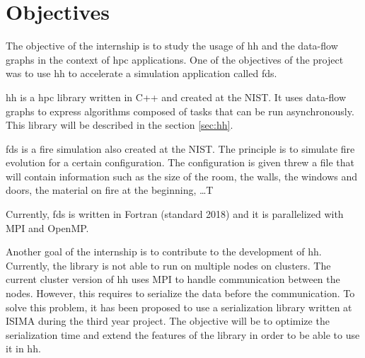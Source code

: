 
\clearpage
\section{Objectives}

The objective of the internship is to study the usage of \gls{hh} and the
data-flow graphs in the context of \gls{hpc} applications. One of the objectives
of the project was to use \gls{hh} to accelerate a simulation application called
\gls{fds}.

\gls{hh} is a \gls{hpc} library written in C++ and created at the NIST. It uses
data-flow graphs to express algorithms composed of tasks that can be run
asynchronously. This library will be described in the section \ref{sec:hh}.

\gls{fds} is a fire simulation also created at the NIST. The principle is to
simulate fire evolution for a certain configuration. The configuration is given
threw a file that will contain information such as the size of the room, the
walls, the windows and doors, the material on fire at the beginning, \dots T

Currently, \gls{fds} is written in Fortran (standard 2018) and it is parallelized
with MPI and OpenMP.

Another goal of the internship is to contribute to the development of \gls{hh}.
Currently, the library is not able to run on multiple nodes on clusters. The
current cluster version of \gls{hh} uses MPI to handle communication between the
nodes. However, this requires to serialize the data before the communication. To
solve this problem, it has been proposed to use a serialization library written
at ISIMA during the third year project. The objective will be to optimize the
serialization time and extend the features of the library in order to be able to
use it in \gls{hh}.
